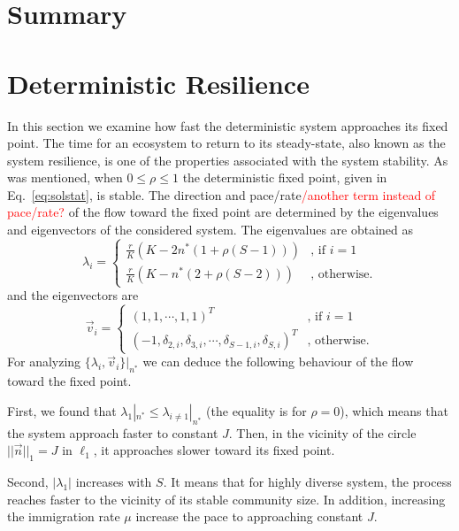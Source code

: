 \documentclass[9pt,lineno]{elife}
\begin{document}
\section{Summary}

 
 \iffalse
\section{Deterministic Resilience}

In this section we examine how fast the deterministic system approaches its fixed point. The time for an ecosystem to return to its steady-state, also known as the system resilience, is one of the properties associated with the system stability.   As was mentioned, when $0\leq \rho\leq 1$ the deterministic fixed point, given in Eq.~\eqref{eq:solstat}, is stable. The direction and pace/rate\textcolor{red}{/another term instead of pace/rate? } of the flow toward the fixed point are determined by the eigenvalues and eigenvectors of the considered system.  The eigenvalues are obtained as 
\begin{equation}
\lambda_i =
\begin{cases}
\frac{r}{K}\left( K - 2 n^*(1+\rho(S-1)) \right) & \text{, if } i=1 \\
\frac{r}{K}\left( K - n^*(2+\rho(S-2)) \right) & \text{, otherwise}.
\end{cases}
\end{equation}
and the eigenvectors are 
\begin{equation}
\vec{v}_i =
\begin{cases}
(1,1,\cdots,1,1)^T & \text{, if } i=1 \\
(-1,\delta_{2,i},\delta_{3,i},\cdots,\delta_{S-1,i},\delta_{S,i})^T & \text{, otherwise}.
\end{cases}
\end{equation}
For analyzing $\{\lambda_i,\vec{v}_i\}|_{n^*}$ we can deduce the following behaviour of the flow toward the fixed point.  

First, we found that $\lambda_1|_{n^*} \leq \lambda_{i\neq 1}|_{n^*}$ (the equality is for $\rho=0$), which means that the system approach faster to constant $J$. Then, in the vicinity of the circle $||\vec{n}||_1=J$ in $\ell_1$, it approaches slower toward its fixed point. 

Second, $|\lambda_1|$ increases with $S$. It means that for highly diverse system, the process reaches faster to the vicinity of its stable community size. In addition, increasing the immigration rate $\mu$ increase the pace to approaching constant $J$.   
\end{document}
